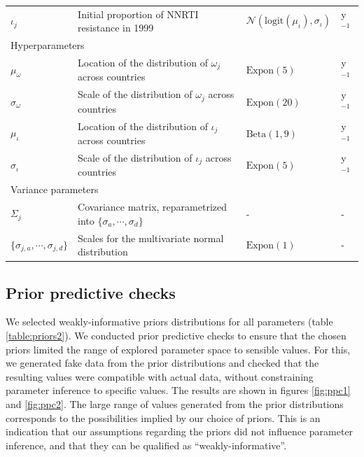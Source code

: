 \documentclass{article}
\begin{document}
\begin{table}[H]
\begin{tabular}{lp{9.5cm}p{2.9cm}l}
			\hspace{.8em}$\iota_j$ & Initial proportion of NNRTI resistance in 1999 & $\mathcal{N}(\text{logit} (\mu_{\iota}),\sigma_{\iota})$ & y$^{-1}$\\ [.2em]
			\multicolumn{4}{l}{{Hyperparameters}} \\[.2em]
			\hspace{.8em}$\mu_{\omega}$ & Location of the distribution of $\omega_j$ across countries & $\text{Expon}(5)$ & y$^{-1}$\\ 
			\hspace{.8em}$\sigma_{\omega}$ &  Scale of the distribution of  $\omega_j$ across countries & $\text{Expon}(20)$ & y$^{-1}$\\ 
			\hspace{.8em}$\mu_{\iota}$ & Location of the distribution of $\iota_j$ across countries & $\text{Beta}(1,9)$ & y$^{-1}$\\ 
			\hspace{.8em}$\sigma_{\iota}$ &  Scale of the distribution of  $\iota_j$ across countries & $\text{Expon}(5)$ & y$^{-1}$\\ [.2em]
			\multicolumn{4}{l}{{Variance parameters}} \\[.2em]
			\hspace{.8em}$\Sigma_j$ & Covariance matrix, reparametrized into $\{\sigma_a,\cdots,\sigma_d\}$ & - & -\\ 
			\hspace{.8em}$\{\sigma_{j,a},\cdots,\sigma_{j,d}\}$ & Scales for the multivariate normal distribution & $\text{Expon}(1)$& -\\
			\hline 
			
		\end{tabular} 
	\end{table}
	
	
	\subsection{Prior predictive checks}
	
	We selected weakly-informative priors distributions for all parameters (table \ref{table:priors2}).
	We conducted prior predictive checks \cite{gabry2019visualization} to ensure that the chosen priors limited the range of explored parameter space to sensible values.
	For this, we generated fake data from the prior distributions and checked that the resulting values were compatible with actual data, without constraining parameter inference to specific values.
	The results are shown in figures \ref{fig:ppc1} and \ref{fig:ppc2}.
	The large range of values generated from the prior distributions corresponds to the possibilities implied by our choice of priors.
	This is an indication that our assumptions regarding the priors did not influence parameter inference, and that they can be qualified as ``weakly-informative''.
	
\end{document}
